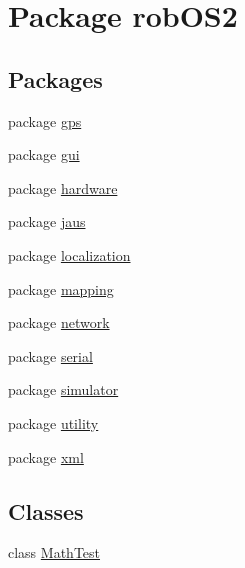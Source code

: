 \hypertarget{namespacerob_o_s2}{
\section{Package robOS2}
\label{namespacerob_o_s2}
}
\subsection*{Packages}
\begin{DoxyCompactItemize}
\item 
package \hyperlink{namespacerob_o_s2_1_1gps}{gps}
\item 
package \hyperlink{namespacerob_o_s2_1_1gui}{gui}
\item 
package \hyperlink{namespacerob_o_s2_1_1hardware}{hardware}
\item 
package \hyperlink{namespacerob_o_s2_1_1jaus}{jaus}
\item 
package \hyperlink{namespacerob_o_s2_1_1localization}{localization}
\item 
package \hyperlink{namespacerob_o_s2_1_1mapping}{mapping}
\item 
package \hyperlink{namespacerob_o_s2_1_1network}{network}
\item 
package \hyperlink{namespacerob_o_s2_1_1serial}{serial}
\item 
package \hyperlink{namespacerob_o_s2_1_1simulator}{simulator}
\item 
package \hyperlink{namespacerob_o_s2_1_1utility}{utility}
\item 
package \hyperlink{namespacerob_o_s2_1_1xml}{xml}
\end{DoxyCompactItemize}
\subsection*{Classes}
\begin{DoxyCompactItemize}
\item 
class \hyperlink{classrob_o_s2_1_1_math_test}{MathTest}
\end{DoxyCompactItemize}
